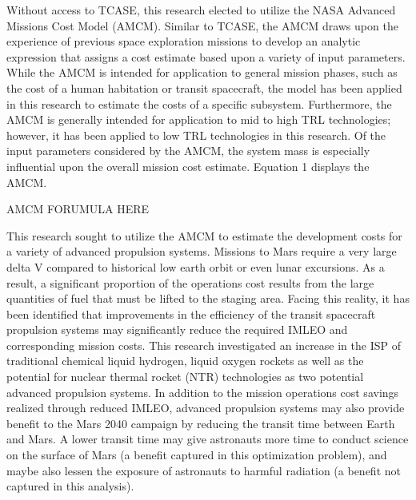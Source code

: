 \documentclass[]{aiaa-pretty}
\begin{document}
Without access to TCASE, this research elected to utilize the NASA Advanced Missions Cost Model (AMCM). Similar to TCASE, the AMCM draws upon the experience of previous space exploration missions to develop an analytic expression that assigns a cost estimate based upon a variety of input parameters. While the AMCM is intended for application to general mission phases, such as the cost of a human habitation or transit spacecraft, the model has been applied in this research to estimate the costs of a specific subsystem. Furthermore, the AMCM is generally intended for application to mid to high TRL technologies; however, it has been applied to low TRL technologies in this research. \cite{jones2015estimating} Of the input parameters considered by the AMCM, the system mass is especially influential upon the overall mission cost estimate. Equation 1 displays the AMCM. \cite{larson1999human}

AMCM FORUMULA HERE

This research sought to utilize the AMCM to estimate the development costs for a variety of advanced propulsion systems. Missions to Mars require a very large delta V compared to historical low earth orbit or even lunar excursions. As a result, a significant proportion of the operations cost results from the large quantities of fuel that must be lifted to the staging area. Facing this reality, it has been identified that improvements in the efficiency of the transit spacecraft propulsion systems may significantly reduce the required IMLEO and corresponding mission costs. This research investigated an increase in the ISP of traditional chemical liquid hydrogen, liquid oxygen rockets as well as the potential for nuclear thermal rocket (NTR) technologies as two potential advanced propulsion systems. In addition to the mission operations cost savings realized through reduced IMLEO, advanced propulsion systems may also provide benefit to the Mars 2040 campaign by reducing the transit time between Earth and Mars. A lower transit time may give astronauts more time to conduct science on the surface of Mars (a benefit captured in this optimization problem), and maybe also lessen the exposure of astronauts to harmful radiation (a benefit not captured in this analysis).
\end{document}
